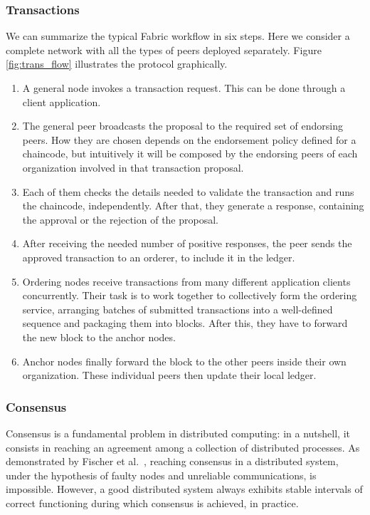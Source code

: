 \subsubsection{Transactions}
We can summarize the typical Fabric workflow in six steps. Here we consider a complete network with all the types of peers deployed separately. Figure \ref{fig:trans_flow} illustrates the protocol graphically.

\begin{figure}[htb]
\end{figure}

\begin{enumerate}
    \item A general node invokes a transaction request. This can be done through a client application.
    \item The general peer broadcasts the proposal to the required set of endorsing peers. How they are chosen depends on the endorsement policy defined for a chaincode, but intuitively it will be composed by the endorsing peers of each organization involved in that transaction proposal.
    \item Each of them checks the details needed to validate the transaction and runs the chaincode, independently. After that, they generate a response, containing the approval or the rejection of the proposal. 
    \item After receiving the needed number of positive responses, the peer sends the approved transaction to an orderer, to include it in the ledger.
    \item Ordering nodes receive transactions from many different application clients concurrently. Their task is to work together to collectively form the ordering service, arranging batches of submitted transactions into a well-defined sequence and packaging them into blocks. After this, they have to forward the new block to the anchor nodes.
    \item Anchor nodes finally forward the block to the other peers inside their own organization. These individual peers then update their local ledger.
\end{enumerate}

\subsubsection{Consensus}
Consensus is a fundamental problem in distributed computing: in a nutshell, it consists in reaching an agreement among a collection of distributed processes.
As demonstrated by Fischer et al.~\cite{consensus_impossible}, reaching consensus in a distributed system, under the hypothesis of faulty nodes and unreliable communications, is impossible. However, a good distributed system always exhibits stable intervals of correct functioning during which consensus is achieved, in practice.

